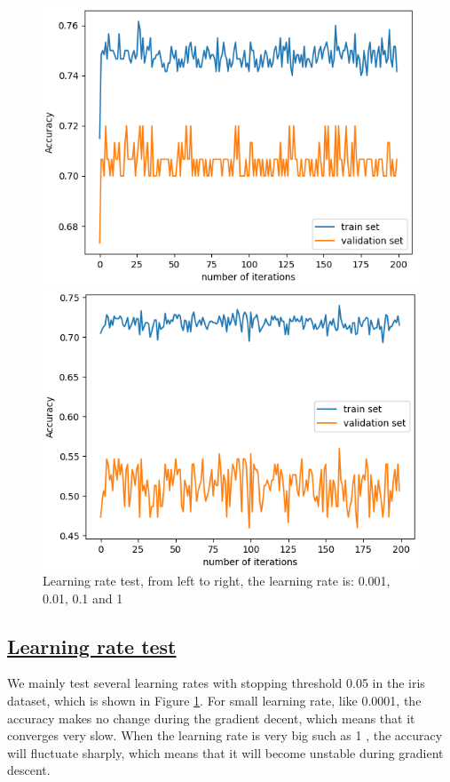 \documentclass[11pt]{scrartcl}
\begin{document}
\begin{figure}[H]
\begin{minipage}{0.8\linewidth}
\begin{minipage}[b]{0.48\linewidth}
			\includegraphics[width= \linewidth]{fig/iris-lr-01.png}
		  \end{minipage}
		  \hfill
		  \begin{minipage}[b]{0.48\linewidth}
			\centering			
			\includegraphics[width= \linewidth]{fig/iris-lr-1.png}
		  \end{minipage}
	\end{minipage}
	\caption{Learning rate test, from left to right, the learning rate is: 0.001, 0.01, 0.1 and 1}
	\label{lr_test}
\end{figure}

\subsection*{\underline{Learning rate test}}
We mainly test several learning rates with stopping threshold 0.05 in the iris dataset, which is shown in Figure \ref{lr_test}. For small learning rate, like 0.0001, the accuracy makes no change during the gradient decent, which means that it converges very slow. When the learning rate is very big such as 1 , the accuracy will fluctuate sharply, which means that it will become unstable during gradient descent. 
\end{document}
